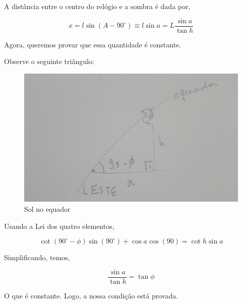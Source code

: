 \documentclass[11pt]{article}
\begin{document}
\begin{pproblem}
\begin{pssolution*}{}{}
\begin{alternativas}
        A distância entre o centro do relógio e a sombra é dada por,

        \[x = l\sin (A-90^{\circ})\equiv l\sin a = L\frac{\sin a}{\tan h}\]

        Agora, queremos provar que essa quantidade é constante.

        \item Observe o seguinte triângulo: 
        
        \begin{figure}[H]
            \centering
            \includegraphics[width=0.5\linewidth]{imagens/trigesf1.jpg}
            \caption{Sol no equador}
        \end{figure}

        Usando a Lei dos quatro elementos, 

        \[\cot(90^\circ -\phi)\sin(90^{\circ})+\cos a \cos(90) = \cot h \sin a\]

        Simplificando, temos, 

        \[\frac{\sin a}{\tan h } = \tan {\phi}\]

        O que é constante. Logo, a nossa condição está provada.

    \end{alternativas}
\end{pssolution*}
\end{pproblem}
\end{document}

